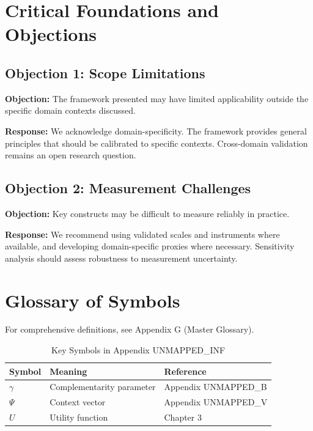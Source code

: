 \section{Critical Foundations and Objections}
\label{sec:inf-foundations}

\subsection{Objection 1: Scope Limitations}

\textbf{Objection:} The framework presented may have limited applicability
outside the specific domain contexts discussed.

\textbf{Response:} We acknowledge domain-specificity. The framework provides
general principles that should be calibrated to specific contexts. Cross-domain
validation remains an open research question.

\subsection{Objection 2: Measurement Challenges}

\textbf{Objection:} Key constructs may be difficult to measure reliably in
practice.

\textbf{Response:} We recommend using validated scales and instruments where
available, and developing domain-specific proxies where necessary. Sensitivity
analysis should assess robustness to measurement uncertainty.



\section{Glossary of Symbols}
\label{sec:inf-glossary}

For comprehensive definitions, see Appendix G (Master Glossary).

\begin{table}[htbp]
\centering
\caption{Key Symbols in Appendix UNMAPPED_INF}
\begin{tabular}{lll}
\toprule
\textbf{Symbol} & \textbf{Meaning} & \textbf{Reference} \\
\midrule
$\gamma$ & Complementarity parameter & Appendix UNMAPPED_B \\
$\Psi$ & Context vector & Appendix UNMAPPED_V \\
$U$ & Utility function & Chapter 3 \\
\bottomrule
\end{tabular}
\end{table}



